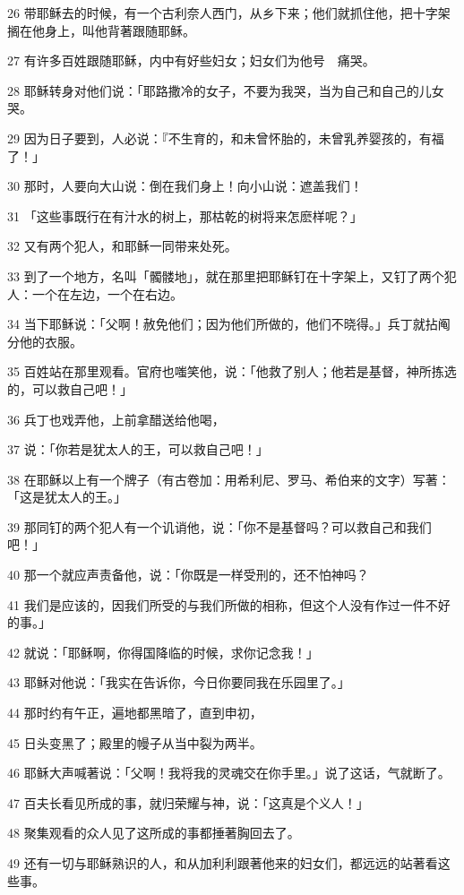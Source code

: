 \par 26 带耶稣去的时候，有一个古利奈人西门，从乡下来；他们就抓住他，把十字架搁在他身上，叫他背著跟随耶稣。
\par 27 有许多百姓跟随耶稣，内中有好些妇女；妇女们为他号　痛哭。
\par 28 耶稣转身对他们说：「耶路撒冷的女子，不要为我哭，当为自己和自己的儿女哭。
\par 29 因为日子要到，人必说：『不生育的，和未曾怀胎的，未曾乳养婴孩的，有福了！」
\par 30 那时，人要向大山说：倒在我们身上！向小山说：遮盖我们！
\par 31 「这些事既行在有汁水的树上，那枯乾的树将来怎麽样呢？」
\par 32 又有两个犯人，和耶稣一同带来处死。
\par 33 到了一个地方，名叫「髑髅地」，就在那里把耶稣钉在十字架上，又钉了两个犯人：一个在左边，一个在右边。
\par 34 当下耶稣说：「父啊！赦免他们；因为他们所做的，他们不晓得。」兵丁就拈阄分他的衣服。
\par 35 百姓站在那里观看。官府也嗤笑他，说：「他救了别人；他若是基督，神所拣选的，可以救自己吧！」
\par 36 兵丁也戏弄他，上前拿醋送给他喝，
\par 37 说：「你若是犹太人的王，可以救自己吧！」
\par 38 在耶稣以上有一个牌子（有古卷加：用希利尼、罗马、希伯来的文字）写著：「这是犹太人的王。」
\par 39 那同钉的两个犯人有一个讥诮他，说：「你不是基督吗？可以救自己和我们吧！」
\par 40 那一个就应声责备他，说：「你既是一样受刑的，还不怕神吗？
\par 41 我们是应该的，因我们所受的与我们所做的相称，但这个人没有作过一件不好的事。」
\par 42 就说：「耶稣啊，你得国降临的时候，求你记念我！」
\par 43 耶稣对他说：「我实在告诉你，今日你要同我在乐园里了。」
\par 44 那时约有午正，遍地都黑暗了，直到申初，
\par 45 日头变黑了；殿里的幔子从当中裂为两半。
\par 46 耶稣大声喊著说：「父啊！我将我的灵魂交在你手里。」说了这话，气就断了。
\par 47 百夫长看见所成的事，就归荣耀与神，说：「这真是个义人！」
\par 48 聚集观看的众人见了这所成的事都捶著胸回去了。
\par 49 还有一切与耶稣熟识的人，和从加利利跟著他来的妇女们，都远远的站著看这些事。
